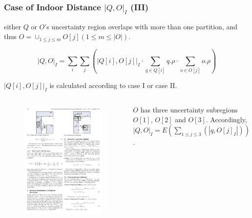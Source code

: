 
\begin{frame}
\frametitle{Case of Indoor Distance $|Q, O|_I$ (III)}

 \quad either $Q$ or $O$'s uncertainty region overlaps with more than one partition, and thus $O = \cup_{1 \leq j \leq m}O[j](1 \leq m \leq |O|)$.

\begin{equation}
  |Q, O|_I = \sum_{i}\sum_{j}(|Q[i],O[j]|_I \cdot \sum_{q \in Q[i]}q.\rho \cdot \sum_{o \in O[j]}o.\rho)
\end{equation}

$|Q[i],O[j]|_I$ is calculated according to case I or case II.

\vspace{-5pt}
\begin{columns}[c]

  \begin{figure}[tb]
    \includegraphics[width=\columnwidth]{figures/2-7/2-7-3.pdf}
  \end{figure}

  \begin{example}
    $O$ has three uncertainty subregions $O[1]$, $O[2]$ and $O[3]$. Accordingly, $|Q,O|_I = E(\sum_{1 \leq j \leq 3}(|q, O[j]_I|))$.
  \end{example}

\end{columns}

\end{frame}

